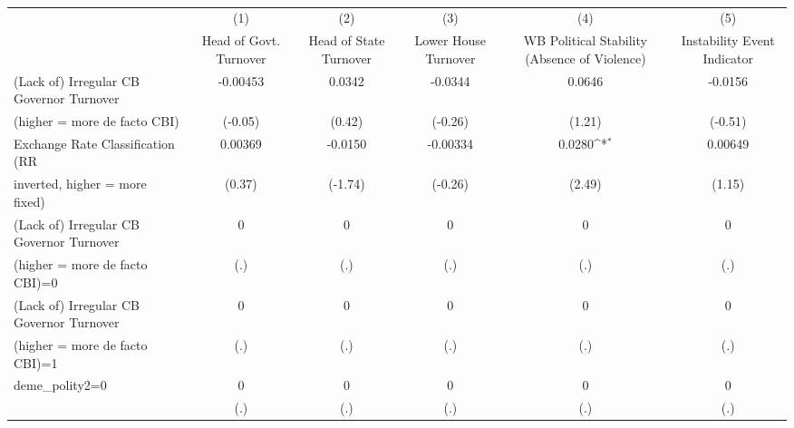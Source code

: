 \begin{table}[htbp]\centering
\def\sym#1{\ifmmode^{#1}\else\(^{#1}\)\fi}
\caption{\label{binarydemcmultIndFEDF}}
\begin{tabular}{l*{5}{c}}
\toprule
                                        &\multicolumn{1}{c}{(1)}&\multicolumn{1}{c}{(2)}&\multicolumn{1}{c}{(3)}&\multicolumn{1}{c}{(4)}&\multicolumn{1}{c}{(5)}\\
                                        &\multicolumn{1}{c}{Head of Govt. Turnover}&\multicolumn{1}{c}{Head of State Turnover}&\multicolumn{1}{c}{Lower House Turnover}&\multicolumn{1}{c}{WB Political Stability (Absence of Violence)}&\multicolumn{1}{c}{Instability Event Indicator}\\
\midrule
(Lack of) Irregular CB Governor Turnover& -0.00453         &   0.0342         &  -0.0344         &   0.0646         &  -0.0156         \\
(higher = more de facto CBI)            &  (-0.05)         &   (0.42)         &  (-0.26)         &   (1.21)         &  (-0.51)         \\
\addlinespace
Exchange Rate Classification (RR        &  0.00369         &  -0.0150         & -0.00334         &   0.0280\sym{*}  &  0.00649         \\
inverted, higher = more fixed)          &   (0.37)         &  (-1.74)         &  (-0.26)         &   (2.49)         &   (1.15)         \\
\addlinespace
(Lack of) Irregular CB Governor Turnover&        0         &        0         &        0         &        0         &        0         \\
(higher = more de facto CBI)=0          &      (.)         &      (.)         &      (.)         &      (.)         &      (.)         \\
\addlinespace
(Lack of) Irregular CB Governor Turnover&        0         &        0         &        0         &        0         &        0         \\
(higher = more de facto CBI)=1          &      (.)         &      (.)         &      (.)         &      (.)         &      (.)         \\
\addlinespace
deme\_polity2=0                          &        0         &        0         &        0         &        0         &        0         \\
                                        &      (.)         &      (.)         &      (.)         &      (.)         &      (.)         \\

\end{tabular}
\end{table}
